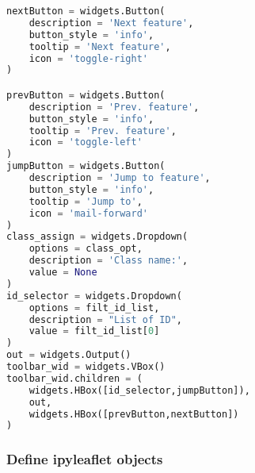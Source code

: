 \begin{lstlisting}[language=Python]
nextButton = widgets.Button(
    description = 'Next feature',
    button_style = 'info',
    tooltip = 'Next feature',
    icon = 'toggle-right'
)

prevButton = widgets.Button(
    description = 'Prev. feature',
    button_style = 'info',
    tooltip = 'Prev. feature',
    icon = 'toggle-left'
)
jumpButton = widgets.Button(
    description = 'Jump to feature',
    button_style = 'info',
    tooltip = 'Jump to',
    icon = 'mail-forward'
)
class_assign = widgets.Dropdown(
    options = class_opt,
    description = 'Class name:',
    value = None
)
id_selector = widgets.Dropdown(
    options = filt_id_list,
    description = "List of ID",
    value = filt_id_list[0]
)
out = widgets.Output()
toolbar_wid = widgets.VBox()
toolbar_wid.children = (
    widgets.HBox([id_selector,jumpButton]),
    out,
    widgets.HBox([prevButton,nextButton])
)
\end{lstlisting}

\hypertarget{define-ipyleaflet-objects}{%
\subsubsection{Define ipyleaflet
objects}\label{define-ipyleaflet-objects}}

